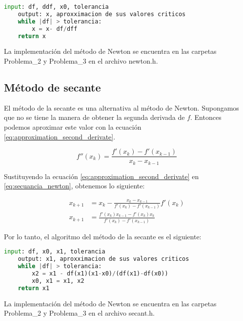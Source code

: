 \begin{lstlisting}[language=python]
    input: df, ddf, x0, tolerancia
    output: x, aproxximacion de sus valores criticos
    while |df| > tolerancia:
        x = x- df/dff
    return x
\end{lstlisting}

La implementación del método de Newton se encuentra en las carpetas \textcolor{citecolor}{Problema\_2} y \textcolor{citecolor}{Problema\_3} en el archivo \textcolor{title}{newton.h}.

\subsection*{Método de secante}

El método de la secante es una alternativa al método de Newton. Supongamos que no se tiene la manera de obtener la segunda derivada de $f$. Entonces podemos aproximar este valor con la ecuación \ref{eq:approximation_second_derivate}.

\begin{equation}
    f''(x_k) = \frac{f'(x_k)-f'(x_{k-1})}{x_k-x_{k-1}}
    \label{eq:approximation_second_derivate}
\end{equation}

Sustituyendo la ecuación \ref{eq:approximation_second_derivate} en \ref{eq:secuancia_newton}, obtenemos lo siguiente:

\begin{align}
    x_{k+1} & = x_k - \frac{x_k-x_{k-1}}{f'(x_k)-f'(x_{k-1})} f'(x_k) \nonumber                  \\
    x_{k+1} & = \frac{f'(x_k)x_{k-1}-f'(x_k)x_k}{f'(x_k)-f'(x_{k-1})} \label{eq:sequence_secant}
\end{align}

Por lo tanto, el algoritmo del método de la secante es el siguiente:

\begin{lstlisting}[language=python]
    input: df, x0, x1, tolerancia
    output: x1, aproxximacion de sus valores criticos
    while |df| > tolerancia:
        x2 = x1 - df(x1)(x1-x0)/(df(x1)-df(x0))
        x0, x1 = x1, x2
    return x1
\end{lstlisting}

La implementación del método de Newton se encuentra en las carpetas \textcolor{citecolor}{Problema\_2} y \textcolor{citecolor}{Problema\_3} en el archivo \textcolor{title}{secant.h}.